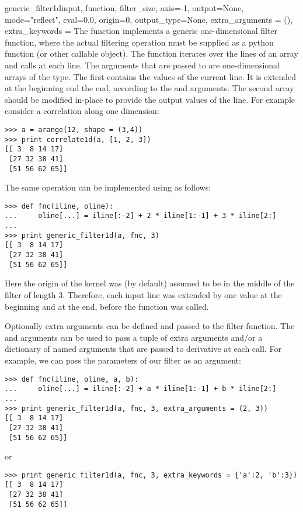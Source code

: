 \begin{funcdesc}{generic_filter1d}{input, function, filter_size, axis=-1,
  output=None, mode="reflect", cval=0.0, origin=0, output_type=None,
  extra_arguments = (), extra_keywords = {}}
  The  function implements a generic 
  one-dimensional filter function, where the actual filtering operation 
  must be supplied as a python function (or other callable object). The 
   function iterates over the lines of an array 
  and calls  at each line. The arguments that are passed to 
   are one-dimensional arrays of the  
  type. The first contains the values of the current line. It is extended 
  at the beginning end the end, according to the  and 
   arguments. The second array should be modified in-place to 
  provide the output values of the line. For example 
  consider a correlation along one dimension:

\begin{verbatim}
>>> a = arange(12, shape = (3,4))
>>> print correlate1d(a, [1, 2, 3])
[[ 3  8 14 17]
 [27 32 38 41]
 [51 56 62 65]]
\end{verbatim}
The same operation can be implemented using  as 
follows:
\begin{verbatim} 
>>> def fnc(iline, oline):
...     oline[...] = iline[:-2] + 2 * iline[1:-1] + 3 * iline[2:]
... 
>>> print generic_filter1d(a, fnc, 3)
[[ 3  8 14 17]
 [27 32 38 41]
 [51 56 62 65]]
\end{verbatim}
  Here the origin of the kernel was (by default) assumed to be in the 
  middle of the filter of length 3. Therefore, each input line was
  extended by one value at the beginning and at the end, before the 
  function was called.
  
  Optionally extra arguments can be defined and passed to the filter 
  function. The  and  arguments 
  can be used to pass a tuple of extra arguments and/or a dictionary of 
  named arguments that are passed to derivative at each call. For example, 
  we can pass the parameters of our filter as an argument:
\begin{verbatim} 
>>> def fnc(iline, oline, a, b):
...     oline[...] = iline[:-2] + a * iline[1:-1] + b * iline[2:]
... 
>>> print generic_filter1d(a, fnc, 3, extra_arguments = (2, 3))
[[ 3  8 14 17]
 [27 32 38 41]
 [51 56 62 65]]
\end{verbatim}
or
\begin{verbatim} 
>>> print generic_filter1d(a, fnc, 3, extra_keywords = {'a':2, 'b':3})
[[ 3  8 14 17]
 [27 32 38 41]
 [51 56 62 65]]
\end{verbatim}
\end{funcdesc}

